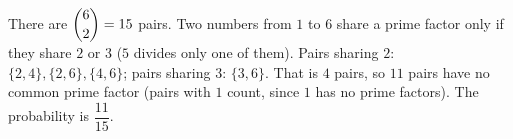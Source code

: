 There are $\dbinom62=15$ pairs. Two numbers from $1$ to $6$ share a prime factor only if they share $2$ or $3$ ($5$ divides only one of them). Pairs sharing $2$: $\{2,4\},\{2,6\},\{4,6\}$; pairs sharing $3$: $\{3,6\}$. That is $4$ pairs, so $11$ pairs have no common prime factor (pairs with $1$ count, since $1$ has no prime factors). The probability is $\boxed{\dfrac{11}{15}}$.
